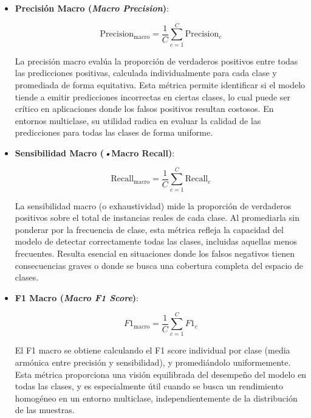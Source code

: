 \begin{itemize}

\item \textbf{Precisión Macro (\textit{Macro Precision})}:

\begin{equation}
\text{Precision}_{\text{macro}} = \frac{1}{C} \sum_{c=1}^{C} \text{Precision}_c
\end{equation}

La precisión macro evalúa la proporción de verdaderos positivos entre todas las predicciones positivas, calculada individualmente para cada clase y promediada de forma equitativa. Esta métrica permite identificar si el modelo tiende a emitir predicciones incorrectas en ciertas clases, lo cual puede ser crítico en aplicaciones donde los falsos positivos resultan costosos. En entornos multiclase, su utilidad radica en evaluar la calidad de las predicciones para todas las clases de forma uniforme.

\item \textbf{Sensibilidad Macro (\textit{•}{Macro Recall})}:

\begin{equation}
\text{Recall}_{\text{macro}} = \frac{1}{C} \sum_{c=1}^{C} \text{Recall}_c
\end{equation}

La sensibilidad macro (o exhaustividad) mide la proporción de verdaderos positivos sobre el total de instancias reales de cada clase. Al promediarla sin ponderar por la frecuencia de clase, esta métrica refleja la capacidad del modelo de detectar correctamente todas las clases, incluidas aquellas menos frecuentes. Resulta esencial en situaciones donde los falsos negativos tienen consecuencias graves o donde se busca una cobertura completa del espacio de clases.

\item \textbf{F1 Macro (\textit{Macro F1 Score})}:

\begin{equation}
F1_{\text{macro}} = \frac{1}{C} \sum_{c=1}^{C} F1_c
\end{equation}

El F1 macro se obtiene calculando el F1 score individual por clase (media armónica entre precisión y sensibilidad), y promediándolo uniformemente. Esta métrica proporciona una visión equilibrada del desempeño del modelo en todas las clases, y es especialmente útil cuando se busca un rendimiento homogéneo en un entorno multiclase, independientemente de la distribución de las muestras.

\end{itemize}

